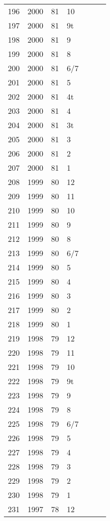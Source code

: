 \begin{longtable}{ |l|l|l|l|l|l|l| }
196 & 2000 & 81 & 10 &  &  &  \\
197 & 2000 & 81 & 9t &  &  &  \\
198 & 2000 & 81 & 9 &  &  &  \\
199 & 2000 & 81 & 8 &  &  &  \\
200 & 2000 & 81 & 6/7 &  &  &  \\
201 & 2000 & 81 & 5 &  &  &  \\
202 & 2000 & 81 & 4t &  &  &  \\
203 & 2000 & 81 & 4 &  &  &  \\
204 & 2000 & 81 & 3t &  &  &  \\
205 & 2000 & 81 & 3 &  &  &  \\
206 & 2000 & 81 & 2 &  &  &  \\
207 & 2000 & 81 & 1 &  &  &  \\
208 & 1999 & 80 & 12 &  &  &  \\
209 & 1999 & 80 & 11 &  &  &  \\
210 & 1999 & 80 & 10 &  &  &  \\
211 & 1999 & 80 & 9 &  &  &  \\
212 & 1999 & 80 & 8 &  &  &  \\
213 & 1999 & 80 & 6/7 &  &  &  \\
214 & 1999 & 80 & 5 &  &  &  \\
215 & 1999 & 80 & 4 &  &  &  \\
216 & 1999 & 80 & 3 &  &  &  \\
217 & 1999 & 80 & 2 &  &  &  \\
218 & 1999 & 80 & 1 &  &  &  \\
219 & 1998 & 79 & 12 &  &  &  \\
220 & 1998 & 79 & 11 &  &  &  \\
221 & 1998 & 79 & 10 &  &  &  \\
222 & 1998 & 79 & 9t &  &  &  \\
223 & 1998 & 79 & 9 &  &  &  \\
224 & 1998 & 79 & 8 &  &  &  \\
225 & 1998 & 79 & 6/7 &  &  &  \\
226 & 1998 & 79 & 5 &  &  &  \\
227 & 1998 & 79 & 4 &  &  &  \\
228 & 1998 & 79 & 3 &  &  &  \\
229 & 1998 & 79 & 2 &  &  &  \\
230 & 1998 & 79 & 1 &  &  &  \\
231 & 1997 & 78 & 12 &  &  &  \\

\end{longtable}

